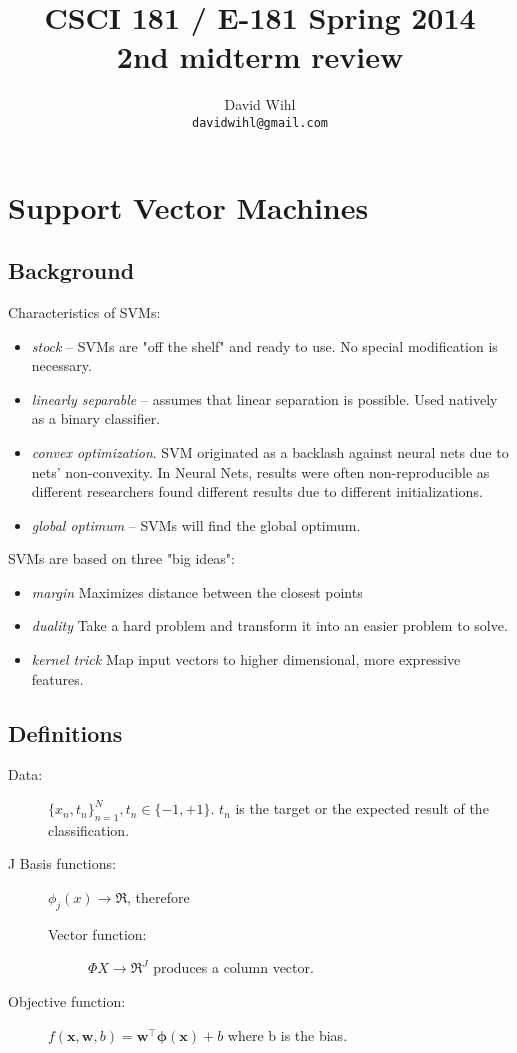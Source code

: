 \documentclass[11pt, oneside]{article}   	%
\title{CSCI 181 / E-181 Spring 2014 \\ 
{\large 2nd midterm review}
}
\author{
  David Wihl\\
  \texttt{davidwihl@gmail.com}
}
\begin{document}
\maketitle

\section{Support Vector Machines}

\subsection{Background}
Characteristics of SVMs:
\begin{itemize}
	\item \emph{stock} -- SVMs are "off the shelf" and ready to use. No special modification is necessary.
	\item \emph{linearly separable} -- assumes that linear separation is possible. Used natively as a binary classifier.
	\item \emph{convex optimization}. SVM originated as a backlash against neural nets due to nets' non-convexity. In Neural Nets, results were often non-reproducible as different researchers found different results due to different initializations.
	\item \emph{global optimum} -- SVMs will find the global optimum.
\end{itemize}

SVMs are based on three "big ideas":
\begin{itemize}
	\item \emph{margin} Maximizes distance between the closest points
	\item \emph{duality} Take a hard problem and transform it into an easier problem to solve.
	\item \emph{kernel trick} Map input vectors to higher dimensional, more expressive features.
\end{itemize}

\subsection{Definitions}

\begin{description}
	\item[Data:] $\{x_n,t_n\}_{n=1}^N, t_n \in \{-1, +1\}$. $t_n$ is the target or the expected result of the classification.
	\item[J Basis functions:] $\phi_j(x)\rightarrow\Re$, therefore
	\begin{description}
		\item[Vector function:] $\Phi X \rightarrow \Re^J$ produces a column vector.
	\end{description}
	\item[Objective function:]
$f(\textbf{x},\textbf{w},b) = \textbf{w}^\intercal \mathbf{\phi}(\textbf{x})  + b$
where b is the bias.
\end{description}
\end{document}

